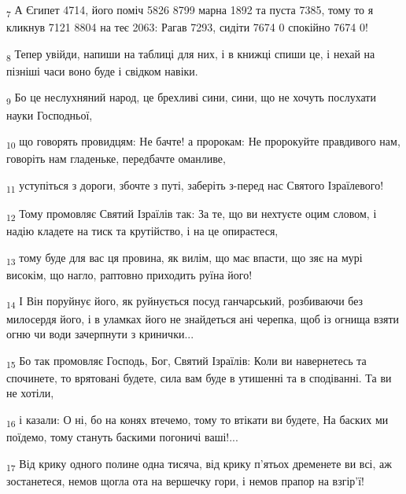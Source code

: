 \begin{tcolorbox}
\textsubscript{7} А Єгипет 4714, його поміч 5826 8799 марна 1892 та пуста 7385, тому то я кликнув 7121 8804 на теє 2063: Рагав 7293, сидіти 7674 0 спокійно 7674 0!
\end{tcolorbox}
\begin{tcolorbox}
\textsubscript{8} Тепер увійди, напиши на таблиці для них, і в книжці спиши це, і нехай на пізніші часи воно буде і свідком навіки.
\end{tcolorbox}
\begin{tcolorbox}
\textsubscript{9} Бо це неслухняний народ, це брехливі сини, сини, що не хочуть послухати науки Господньої,
\end{tcolorbox}
\begin{tcolorbox}
\textsubscript{10} що говорять провидцям: Не бачте! а пророкам: Не пророкуйте правдивого нам, говоріть нам гладеньке, передбачте оманливе,
\end{tcolorbox}
\begin{tcolorbox}
\textsubscript{11} уступіться з дороги, збочте з путі, заберіть з-перед нас Святого Ізраїлевого!
\end{tcolorbox}
\begin{tcolorbox}
\textsubscript{12} Тому промовляє Святий Ізраїлів так: За те, що ви нехтуєте оцим словом, і надію кладете на тиск та крутійство, і на це опираєтеся,
\end{tcolorbox}
\begin{tcolorbox}
\textsubscript{13} тому буде для вас ця провина, як вилім, що має впасти, що зяє на мурі високім, що нагло, раптовно приходить руїна його!
\end{tcolorbox}
\begin{tcolorbox}
\textsubscript{14} І Він поруйнує його, як руйнується посуд ганчарський, розбиваючи без милосердя його, і в уламках його не знайдеться ані черепка, щоб із огнища взяти огню чи води зачерпнути з кринички...
\end{tcolorbox}
\begin{tcolorbox}
\textsubscript{15} Бо так промовляє Господь, Бог, Святий Ізраїлів: Коли ви навернетесь та спочинете, то врятовані будете, сила вам буде в утишенні та в сподіванні. Та ви не хотіли,
\end{tcolorbox}
\begin{tcolorbox}
\textsubscript{16} і казали: О ні, бо на конях втечемо, тому то втікати ви будете, На баских ми поїдемо, тому стануть баскими погоничі ваші!...
\end{tcolorbox}
\begin{tcolorbox}
\textsubscript{17} Від крику одного полине одна тисяча, від крику п'ятьох дременете ви всі, аж зостанетеся, немов щогла ота на вершечку гори, і немов прапор на взгір'ї!
\end{tcolorbox}
